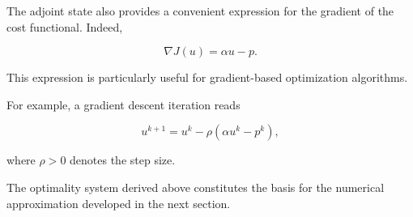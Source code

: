 The adjoint state also provides a convenient expression for the gradient of the cost functional. 
Indeed,

\begin{equation}
\nabla J(u)
=
\alpha u-p.
\label{eq:gradient}
\end{equation}

This expression is particularly useful for gradient-based optimization algorithms.

For example, a gradient descent iteration reads

\begin{equation}
u^{k+1}
=
u^k
-
\rho
\left(
\alpha u^k-p^k
\right),
\label{eq:gradient_descent}
\end{equation}

where \(\rho>0\) denotes the step size.

The optimality system derived above constitutes the basis for the numerical approximation 
developed in the next section.

